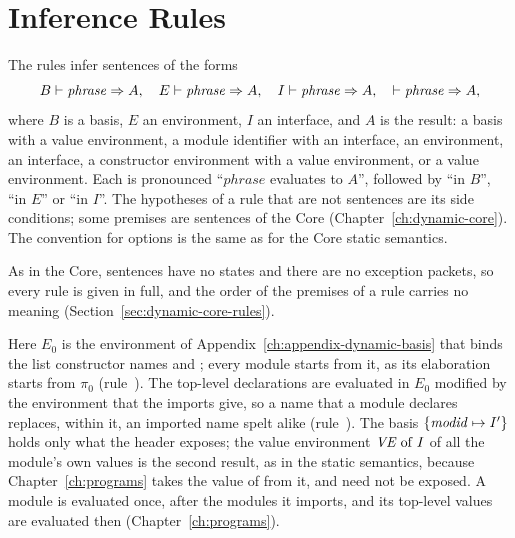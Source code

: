 \section{Inference Rules}\label{sec:dynamic-modules-rules}

The rules infer sentences of the forms
\[
  B \vdash \mathit{phrase} \Rightarrow A,\quad
  E \vdash \mathit{phrase} \Rightarrow A,\quad
  I \vdash \mathit{phrase} \Rightarrow A,\quad
  \vdash \mathit{phrase} \Rightarrow A,
\]
where $B$ is a basis, $E$ an environment, $I$ an interface, and $A$ is the
result: a basis with a value environment, a module identifier with an
interface, an environment, an interface, a constructor environment with a
value environment, or a value environment. Each is pronounced ``$\mathit{phrase}$
evaluates to $A$'', followed by ``in $B$'', ``in $E$'' or ``in $I$''. The
hypotheses of a rule that are not sentences are its side conditions; some
premises are sentences of the Core (Chapter~\ref{ch:dynamic-core}). The
convention for options is the same as for the Core static semantics.

As in the Core, sentences have no states and there are no exception packets,
so every rule is given in full, and the order of the premises of a rule
carries no meaning (Section~\ref{sec:dynamic-core-rules}). %


  {}

\begin{rulecomments}
 Here $E_0$ is the environment of
Appendix~\ref{ch:appendix-dynamic-basis} that binds the list constructor
names \kw{[]} and \kw{::}; every module starts from it, as its elaboration
starts from $\pi_0$ (rule~). %
The top-level declarations are evaluated in
$E_0$ modified by the environment that the imports give, so a name that a module declares replaces,
within it, an imported name spelt alike (rule~). The
basis $\{\mathit{modid}\mapsto I'\}$ holds only what the header exposes; the value
environment $\mathit{VE}\mathrel{\mathrm{of}} I$ of all the module's own values is the second result,
as in the static semantics, because Chapter~\ref{ch:programs} takes the value
of  from it, and  need not be exposed. %
A module is evaluated once, after the modules it imports, and its top-level
values are evaluated then (Chapter~\ref{ch:programs}). %
\end{rulecomments}


